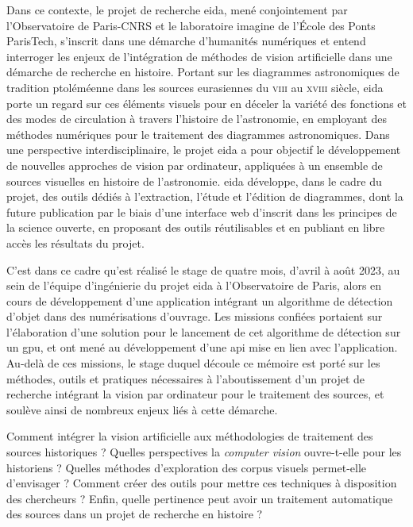 \documentclass[a4paper,12pt,twoside]{book}
\newcommand{\api}{\gls{api}\xspace}
\newcommand{\eida}{\gls{eida}\xspace}
\newcommand{\imagine}{\gls{imagine}\xspace}
\newcommand{\ponts}{École des Ponts ParisTech\xspace}
\newcommand{\viii}{\textsc{viii}\ieme{}\xspace}
\newcommand{\xviii}{\textsc{xviii}\ieme{}\xspace}
\begin{document}
	Dans ce contexte, le projet de recherche \eida, mené conjointement par l'Observatoire de Paris-CNRS et le laboratoire \imagine de l'\ponts, s'inscrit dans une démarche d'humanités numériques et entend interroger les enjeux de l'intégration de méthodes de vision artificielle dans une démarche de recherche en histoire. Portant sur les diagrammes astronomiques de tradition ptoléméenne dans les sources eurasiennes du \viii au \xviii siècle, \eida porte un regard sur ces éléments visuels pour en déceler la variété des fonctions et des modes de circulation à travers l'histoire de l'astronomie, en employant des méthodes numériques pour le traitement des diagrammes astronomiques. Dans une perspective interdisciplinaire, le projet \eida a pour objectif le développement de nouvelles approches de vision par ordinateur, appliquées à un ensemble de sources visuelles en histoire de l'astronomie. \eida développe, dans le cadre du projet, des outils dédiés à l'extraction, l'étude et l'édition de diagrammes, dont la future publication par le biais d'une interface web d'inscrit dans les principes de la science ouverte, en proposant des outils réutilisables et en publiant en libre accès les résultats du projet.
	
	C'est dans ce cadre qu'est réalisé le stage de quatre mois, d'avril à août 2023, au sein de l'équipe d'ingénierie du projet \eida à l'Observatoire de Paris, alors en cours de développement d'une application intégrant un algorithme de détection d'objet dans des numérisations d'ouvrage. Les missions confiées portaient sur l'élaboration d'une solution pour le lancement de cet algorithme de détection sur un \acrshort{gpu}, et ont mené au développement d'une \api mise en lien avec l'application. Au-delà de ces missions, le stage duquel découle ce mémoire est porté sur les méthodes, outils et pratiques nécessaires à l'aboutissement d'un projet de recherche intégrant la vision par ordinateur pour le traitement des sources, et soulève ainsi de nombreux enjeux liés à cette démarche.
	
	Comment intégrer la vision artificielle aux méthodologies de traitement des sources historiques ? Quelles perspectives la \textit{computer vision} ouvre-t-elle pour les historiens ? Quelles méthodes d'exploration des corpus visuels permet-elle d'envisager ? Comment créer des outils pour mettre ces techniques à disposition des chercheurs ? Enfin, quelle pertinence peut avoir un traitement automatique des sources dans un projet de recherche en histoire ?
	
\end{document}
